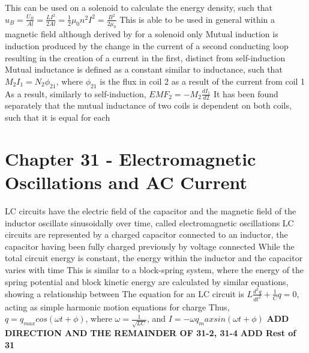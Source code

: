 \documentclass[11 pt, twoside]{article}
\newenvironment{outline*}
{
	\begin{outline}[enumerate]
	}
	{\end{outline}
}
\begin{document}
\begin{outline*}
\3 This can be used on a solenoid to calculate the energy density, such that $u_B = \frac{U_B}{Al} = \frac{LI^2}{2Al} = \frac{1}{2}\mu_0n^2I^2 = \frac{B^2}{2\mu_0}$
\4 This is able to be used in general within a magnetic field although derived by for a solenoid only
\1 Mutual induction is induction produced by the change in the current of a second conducting loop resulting in the creation of a current in the first, distinct from self-induction
\2 Mutual inductance is defined as a constant similar to inductance, such that $M_2I_1 = N_2\phi_{21}$, where $\phi_{21}$ is the flux in coil 2 as a result of the current from coil 1
\2 As a result, similarly to self-induction, $EMF_2 = -M_2\frac{dI_1}{d2}$
\2 It has been found separately that the mutual inductance of two coils is dependent on both coils, such that it is equal for each
\end{outline*}
\section{Chapter 31 - Electromagnetic Oscillations and AC Current}
\begin{outline*}
\1 LC circuits have the electric field of the capacitor and the magnetic field of the inductor oscillate sinusoidally over time, called electromagnetic oscillations
\2 LC circuits are represented by a charged capacitor connected to an inductor, the capacitor having been fully charged previously by voltage connected
\2 While the total circuit energy is constant, the energy within the inductor and the capacitor varies with time
\3 This is similar to a block-spring system, where the energy of the spring potential and block kinetic energy are calculated by similar equations, showing a relationship between
\2 The equation for an LC circuit is $L\frac{d^2q}{dt^2} + \frac{1}{C}q = 0$, acting as simple harmonic motion equations for charge
\3 Thus, $q = q_{max}cos(\omega t + \phi)$, where $\omega = \frac{1}{\sqrt{LC}}$, and $I = -\omega q_max sin(\omega t + \phi)$
\1 \textbf{ADD DIRECTION AND THE REMAINDER OF 31-2, 31-4}
\1 \textbf{ADD Rest of 31}
\end{outline*}
\end{document}
